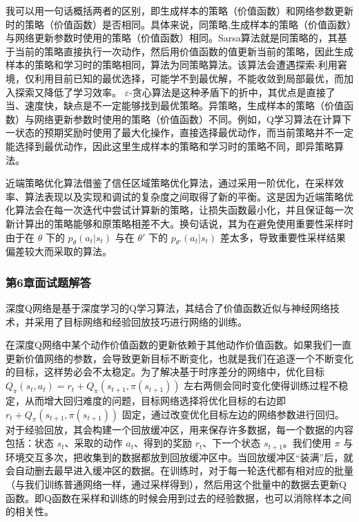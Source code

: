 我可以用一句话概括两者的区别，即生成样本的策略（价值函数）和网络参数更新时的策略（价值函数）是否相同。具体来说，同策略,生成样本的策略（价值函数）与网络更新参数时使用的策略（价值函数）相同。Sarsa算法就是同策略的，其基于当前的策略直接执行一次动作，然后用价值函数的值更新当前的策略，因此生成样本的策略和学习时的策略相同，算法为同策略算法。该算法会遭遇探索-利用窘境，仅利用目前已知的最优选择，可能学不到最优解，不能收敛到局部最优，而加入探索又降低了学习效率。 $\varepsilon$-贪心算法是这种矛盾下的折中，其优点是直接了当、速度快，缺点是不一定能够找到最优策略。异策略，生成样本的策略（价值函数）与网络更新参数时使用的策略（价值函数）不同。例如，Q学习算法在计算下一状态的预期奖励时使用了最大化操作，直接选择最优动作，而当前策略并不一定能选择到最优动作，因此这里生成样本的策略和学习时的策略不同，即异策略算法。


近端策略优化算法借鉴了信任区域策略优化算法，通过采用一阶优化，在采样效率、算法表现以及实现和调试的复杂度之间取得了新的平衡。这是因为近端策略优化算法会在每一次迭代中尝试计算新的策略，让损失函数最小化，并且保证每一次新计算出的策略能够和原策略相差不大。换句话说，其为在避免使用重要性采样时由于在 $\theta$ 下的 $p_{\theta}\left(a_{t} | s_{t}\right)$ 与在 $\theta'$ 下的 $ p_{\theta'}\left(a_{t} | s_{t}\right) $ 差太多，导致重要性采样结果偏差较大而采取的算法。



\subsubsection*{第6章面试题解答}


深度Q网络是基于深度学习的Q学习算法，其结合了价值函数近似与神经网络技术，并采用了目标网络和经验回放技巧进行网络的训练。


在深度Q网络中某个动作价值函数的更新依赖于其他动作价值函数。如果我们一直更新价值网络的参数，会导致更新目标不断变化，也就是我们在追逐一个不断变化的目标，这样势必会不太稳定。为了解决基于时序差分的网络中，优化目标 $Q_{\pi}\left(s_{t}, a_{t}\right) =r_{t}+Q_{\pi}\left(s_{t+1}, \pi\left(s_{t+1}\right)\right)$ 左右两侧会同时变化使得训练过程不稳定，从而增大回归难度的问题，目标网络选择将优化目标的右边即 $r_{t}+Q_{\pi}\left(s_{t+1}, \pi\left(s_{t+1}\right)\right)$ 固定，通过改变优化目标左边的网络参数进行回归。对于经验回放，其会构建一个回放缓冲区，用来保存许多数据，每一个数据的内容包括：状态 $s_t$、采取的动作 $a_t$、得到的奖励 $r_t$、下一个状态 $s_{t+1}$。我们使用 $\pi$ 与环境交互多次，把收集到的数据都放到回放缓冲区中。当回放缓冲区“装满”后，就会自动删去最早进入缓冲区的数据。在训练时，对于每一轮迭代都有相对应的批量（与我们训练普通网络一样，通过采样得到），然后用这个批量中的数据去更新Q函数。即Q函数在采样和训练的时候会用到过去的经验数据，也可以消除样本之间的相关性。

